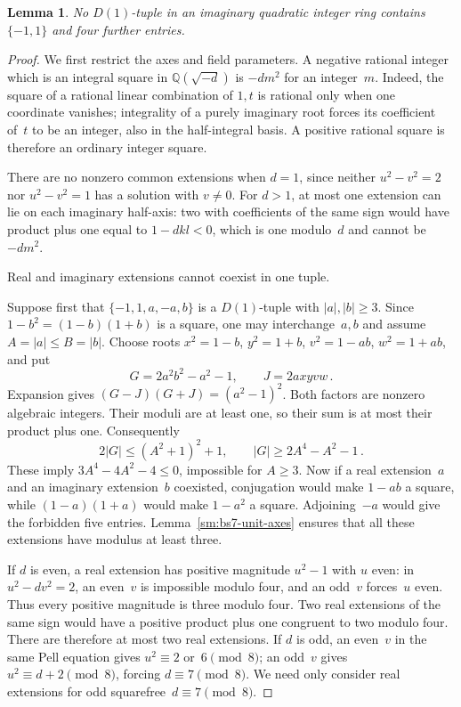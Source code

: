 \documentclass[12pt]{article}
\newtheorem{lemma}[theorem]{Lemma}
\numberwithin{equation}{section}
\begin{document}
\begin{lemma}\label{sm:bs7-unit-pair}
No $D(1)$-tuple in an imaginary quadratic integer ring contains $\{-1,1\}$ and four further entries.
\end{lemma}
\begin{proof}
We first restrict the axes and field parameters. A negative rational integer which is an integral square in $\mathbb Q(\sqrt{-d})$ is $-dm^2$ for an integer~$m$. Indeed, the square of a rational linear combination of $1,t$ is rational only when one coordinate vanishes; integrality of a purely imaginary root forces its coefficient of~$t$ to be an integer, also in the half-integral basis. A positive rational square is therefore an ordinary integer square.

There are no nonzero common extensions when $d=1$, since neither $u^2-v^2=2$ nor $u^2-v^2=1$ has a solution with $v\ne0$. For $d>1$, at most one extension can lie on each imaginary half-axis: two with coefficients of the same sign would have product plus one equal to $1-dkl<0$, which is one modulo~$d$ and cannot be $-dm^2$.

Real and imaginary extensions cannot coexist in one tuple.

Suppose first that $\{-1,1,a,-a,b\}$ is a $D(1)$-tuple with $|a|,|b|\ge3$. Since $1-b^2=(1-b)(1+b)$ is a square, one may interchange~$a,b$ and assume $A=|a|\le B=|b|$. Choose roots $x^2=1-b$, $y^2=1+b$, $v^2=1-ab$, $w^2=1+ab$, and put
\begin{equation*}
 G=2a^2b^2-a^2-1,\qquad J=2axyvw\,.
\end{equation*}
Expansion gives $(G-J)(G+J)=(a^2-1)^2$. Both factors are nonzero algebraic integers. Their moduli are at least one, so their sum is at most their product plus one. Consequently
\begin{equation*}
 2|G|\le(A^2+1)^2+1,\qquad |G|\ge2A^4-A^2-1\,.
\end{equation*}
These imply $3A^4-4A^2-4\le0$, impossible for $A\ge3$. Now if a real extension~$a$ and an imaginary extension~$b$ coexisted, conjugation would make $1-ab$ a square, while $(1-a)(1+a)$ would make $1-a^2$ a square. Adjoining~$-a$ would give the forbidden five entries. Lemma~\ref{sm:bs7-unit-axes} ensures that all these extensions have modulus at least three.

If $d$ is even, a real extension has positive magnitude $u^2-1$ with $u$ even: in $u^2-dv^2=2$, an even~$v$ is impossible modulo four, and an odd~$v$ forces~$u$ even. Thus every positive magnitude is three modulo four. Two real extensions of the same sign would have a positive product plus one congruent to two modulo four. There are therefore at most two real extensions. If $d$ is odd, an even~$v$ in the same Pell equation gives $u^2\equiv2$ or~$6\pmod8$; an odd~$v$ gives $u^2\equiv d+2\pmod8$, forcing $d\equiv7\pmod8$. We need only consider real extensions for odd squarefree~$d\equiv7\pmod8$.


\end{proof}
\end{document}
